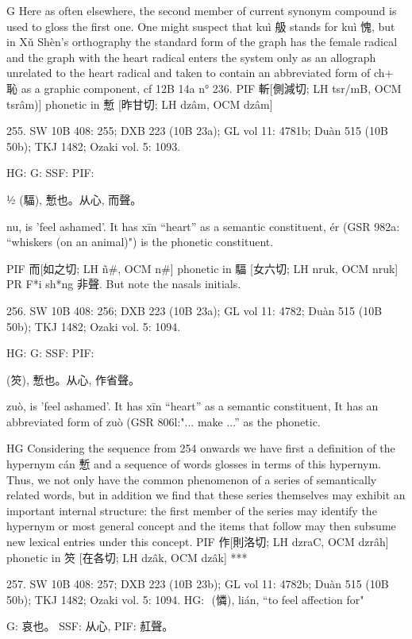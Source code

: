G     Here as often elsewhere, the second member of current synonym compound is used to gloss the first one.
One might suspect that kuì 䑥 stands for kuì 愧, but in Xǔ Shèn's orthography the standard
form of the graph has the female radical and the graph with the heart radical enters the system only as an allograph unrelated to the heart radical and taken to contain an abbreviated form of ch+ 恥 as a graphic component, cf 12B 14a n° 236.
PIF    斬[側減切; LH tsr/mB, OCM tsrâm)] phonetic in 慙 [昨甘切; LH dzâm, OCM dzâm]



255. SW 10B 408: 255; DXB 223 (10B 23a); GL vol 11: 4781b; Duàn 515 (10B 50b); TKJ 1482; Ozaki vol. 5: 1093.


HG:
G: SSF: PIF:

½ (䮠), 慙也。从心,
而聲。


nu,
is 'feel ashamed'.
It has xīn ``heart'' as a semantic constituent,
ér (GSR 982a: ``whiskers (on an animal)") is the phonetic constituent.

PIF     而[如之切; LH ñ\#, OCM n\#] phonetic in 䮠 [女六切; LH nruk, OCM nruk]
PR	F*i sh*ng 非聲. But note the nasals initials.

256. SW 10B 408: 256; DXB 223 (10B 23a); GL vol 11: 4782; Duàn 515 (10B 50b); TKJ 1482; Ozaki vol. 5: 1094.


HG:
G: SSF: PIF:

  (䇜),
慙也。从心,
作省聲。


zuò,
is 'feel ashamed'.
It has xīn ``heart'' as a semantic constituent,
It has an abbreviated form of zuò (GSR 806l:"... make ...'' as the phonetic.

HG    Considering the sequence from 254 onwards we have first a definition of the hypernym cán 慙 and a sequence of words glosses in terms of this hypernym. Thus, we not only have the common phenomenon of a series of semantically related words, but in addition we find that these series themselves may exhibit an important internal structure: the first member of the series may identify the hypernym or most general concept and the items that follow may then subsume new lexical entries under this concept.
PIF     作[則洛切; LH dzraC, OCM dzrâh] phonetic in 䇜 [在各切; LH dzâk, OCM dzâk]
***

257. SW 10B 408: 257; DXB 223 (10B 23b); GL vol 11: 4782b; Duàn 515 (10B 50b); TKJ 1482; Ozaki vol. 5: 1094.
HG:  (憐), lián, ``to feel affection for"

G:	哀也。
SSF: 从心,
PIF: 䞑聲。

